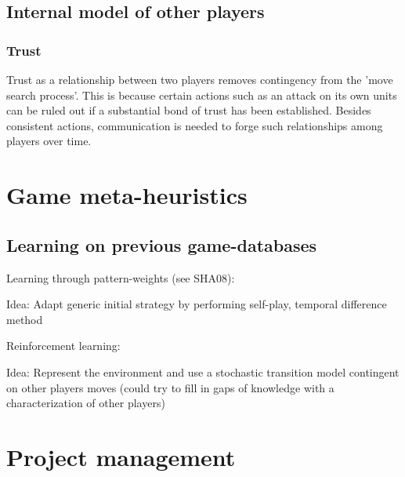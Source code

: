 \documentclass[12pt]{article}
\begin{document}
\subsection{Internal model of other players}

\subsubsection{Trust}

Trust as a relationship between two players removes contingency
from the 'move search process'. This is because certain actions such
as an attack on its own units can be ruled out if a substantial bond of trust
has been established. Besides consistent actions, communication
is needed to forge such relationships among players over time. 

\section{Game meta-heuristics}

\subsection{Learning on previous game-databases}

Learning through pattern-weights (see SHA08):

  Idea: Adapt generic initial strategy by performing 
        self-play, temporal difference method

Reinforcement learning:

  Idea: Represent the environment and use a stochastic
        transition model contingent on other players
        moves (could try to fill in gaps of knowledge 
        with a characterization of other players)

\section{Project management}
\end{document}
